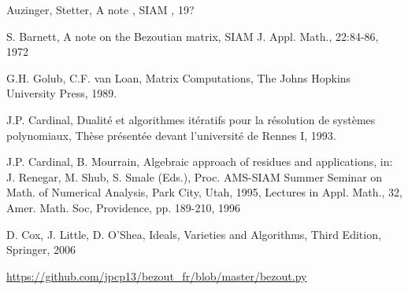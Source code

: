 \documentclass{standalone}
\begin{document}
  \begin{thebibliography}{00}

  {Auzinger, Stetter}, {A note }, {SIAM }, {19?}

  {S. Barnett}, {A note on the Bezoutian matrix}, {SIAM J. Appl. Math., 22:84-86}, {1972}

  {G.H. Golub, C.F. van Loan}, {Matrix Computations}, {The Johns Hopkins University Press}, {1989}.

  {J.P. Cardinal}, {Dualité et algorithmes itératifs pour la résolution de systèmes polynomiaux}, {Thèse présentée devant l'université de Rennes I}, {1993}.

  {J.P. Cardinal, B. Mourrain}, {Algebraic approach of residues and applications}, {in: J. Renegar, M. Shub, S. Smale (Eds.), Proc. AMS-SIAM Summer Seminar on Math. of Numerical Analysis, Park City, Utah, 1995, Lectures in Appl. Math., 32, Amer. Math. Soc, Providence, pp. 189-210}, {1996}

  D. Cox, J. Little, D. O'Shea,
  Ideals, Varieties and Algorithms,
  Third Edition,
  Springer,
  2006

  \url{https://github.com/jpcp13/bezout_fr/blob/master/bezout.py}


  \end{thebibliography}
\end{document}
